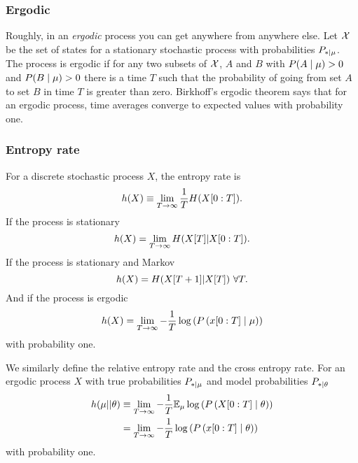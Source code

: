 \subsubsection{Ergodic}
Roughly, in an \emph{ergodic}  process you can
get anywhere from anywhere else.  Let ${\cal X}$ be the set of states
for a stationary stochastic process with probabilities $P_{*\mid \mu}$.
The process is ergodic if for any two subsets of ${\cal X}$, $A$ and
$B$ with $P(A\mid \mu) > 0$ and $P(B\mid \mu) > 0$ there is a time $T$ such
that the probability of going from set $A$ to set $B$ in time $T$ is
greater than zero.  Birkhoff's ergodic theorem says that for an
ergodic process, time averages converge to expected values with
probability one.

\subsubsection{Entropy rate}
For a discrete stochastic process $X$, the entropy rate  is 
\begin{equation}
  \label{eq:hrate1}
  h(X) \equiv \lim_{T \rightarrow \infty} \frac{1}{T} H(X[0:T]).
\end{equation}
If the process is stationary
\begin{equation}
  \label{eq:hrate2}
  h(X) = \lim_{T \rightarrow \infty} H({X}{[T]}|X[0:T]).
\end{equation}
If the process is stationary and Markov
\begin{equation}
  \label{eq:hrate3}
  h(X) =  H({X}{[T+1]}|{X}{[T]})~\forall T.
\end{equation}
And if the process is ergodic
\begin{equation}
  \label{eq:hrate4}
  h(X) = \lim_{T \rightarrow \infty} - \frac{1}{T} \log \left( P \left(x[0:T]\mid \mu \right) \right)
\end{equation}
with probability one.

We similarly define the relative entropy rate and the cross entropy
rate.  For an ergodic process $X$ with true probabilities $P_{*\mid \mu}$ and
model probabilities $P_{*\mid \theta}$
\begin{align}
  \label{eq:hrate5}
  h(\mu||\theta) &\equiv  \lim_{T \rightarrow \infty} - \frac{1}{T}
  \mathbb{E}_\mu \log \left( P \left(X[0:T]\mid \theta \right) \right) \\
  &=  \lim_{T \rightarrow \infty} - \frac{1}{T} \log \left( P
  \left(x[0:T]\mid  \theta \right) \right) \nonumber
\end{align}
with probability one.


